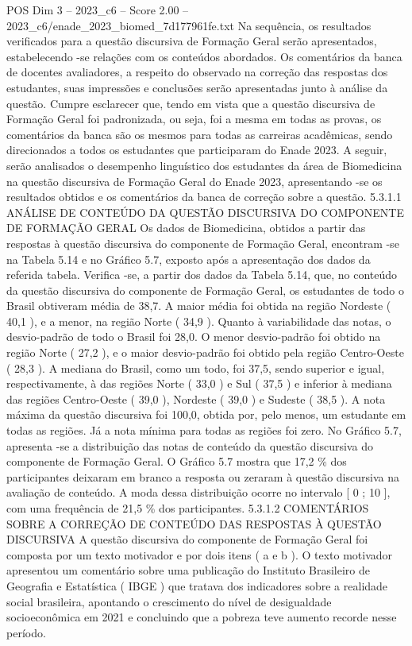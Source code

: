 \begin{textsample}{POS Dim 3 – 2023\_c6 – Score 2.00 – 2023\_c6/enade\_2023\_biomed\_7d177961fe.txt}
Na sequência, os resultados verificados para a questão discursiva de Formação Geral serão apresentados, estabelecendo -se relações com os conteúdos abordados.
Os comentários da banca de docentes avaliadores, a respeito do observado na correção das respostas dos estudantes, suas impressões e conclusões serão apresentadas junto à análise da questão.
Cumpre esclarecer que, tendo em vista que a questão discursiva de Formação Geral foi padronizada, ou seja, foi a mesma em todas as provas, os comentários da banca são os mesmos para todas as carreiras acadêmicas, sendo direcionados a todos os estudantes que participaram do Enade 2023.
A seguir, serão analisados o desempenho linguístico dos estudantes da área de Biomedicina na questão discursiva de Formação Geral do Enade 2023, apresentando -se os resultados obtidos e os comentários da banca de correção sobre a questão. 5.3.1.1 ANÁLISE DE CONTEÚDO DA QUESTÃO DISCURSIVA DO COMPONENTE DE FORMAÇÃO GERAL Os dados de Biomedicina, obtidos a partir das respostas à questão discursiva do componente de Formação Geral, encontram -se na Tabela 5.14 e no Gráfico 5.7, exposto após a apresentação dos dados da referida tabela.
Verifica -se, a partir dos dados da Tabela 5.14, que, no conteúdo da questão discursiva do componente de Formação Geral, os estudantes de todo o Brasil obtiveram média de 38,7.
A maior média foi obtida na região Nordeste ( 40,1 ), e a menor, na região Norte ( 34,9 ).
Quanto à variabilidade das notas, o desvio-padrão de todo o Brasil foi 28,0.
O menor desvio-padrão foi obtido na região Norte ( 27,2 ), e o maior desvio-padrão foi obtido pela região Centro-Oeste ( 28,3 ).
A mediana do Brasil, como um todo, foi 37,5, sendo superior e igual, respectivamente, à das regiões Norte ( 33,0 ) e Sul ( 37,5 ) e inferior à mediana das regiões Centro-Oeste ( 39,0 ), Nordeste ( 39,0 ) e Sudeste ( 38,5 ).
A nota máxima da questão discursiva foi 100,0, obtida por, pelo menos, um estudante em todas as regiões.
Já a nota mínima para todas as regiões foi zero.
No Gráfico 5.7, apresenta -se a distribuição das notas de conteúdo da questão discursiva do componente de Formação Geral.
O Gráfico 5.7 mostra que 17,2 \% dos participantes deixaram em branco a resposta ou zeraram à questão discursiva na avaliação de conteúdo.
A moda dessa distribuição ocorre no intervalo [ 0 ; 10 ], com uma frequência de 21,5 \% dos participantes. 5.3.1.2 COMENTÁRIOS SOBRE A CORREÇÃO DE CONTEÚDO DAS RESPOSTAS À QUESTÃO DISCURSIVA A questão discursiva do componente de Formação Geral foi composta por um texto motivador e por dois itens ( a e b ).
O texto motivador apresentou um comentário sobre uma publicação do Instituto Brasileiro de Geografia e Estatística ( IBGE ) que tratava dos indicadores sobre a realidade social brasileira, apontando o crescimento do nível de desigualdade socioeconômica em 2021 e concluindo que a pobreza teve aumento recorde nesse período.

\end{textsample}
